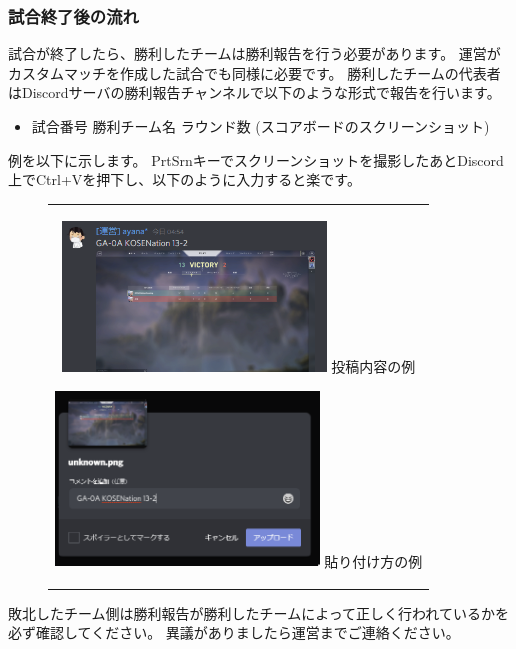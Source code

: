 \documentclass[uplatex,dvipdfmx]{jsarticle}
\begin{document}
	    \subsubsection{試合終了後の流れ}
	        試合が終了したら、勝利したチームは勝利報告を行う必要があります。
	        運営がカスタムマッチを作成した試合でも同様に必要です。
	        勝利したチームの代表者はDiscordサーバの勝利報告チャンネルで以下のような形式で報告を行います。
	        \begin{itemize}
	            \item 試合番号 勝利チーム名 ラウンド数 (スコアボードのスクリーンショット)
	        \end{itemize}
	        例を以下に示します。
	        PrtSrnキーでスクリーンショットを撮影したあとDiscord上でCtrl+Vを押下し、以下のように入力すると楽です。
	        \begin{figure}[H]
	            \begin{center}
	                \begin{tabular}{c}
	                    \begin{minipage}{0.5\hsize}
	                        \begin{center}
	                            \includegraphics[width=70mm]{result.png}
	                            \hspace{1.6cm} 投稿内容の例
	                        \end{center}
	                    \end{minipage}

	                    \begin{minipage}{0.5\hsize}
	                        \begin{center}
	                            \includegraphics[width=70mm]{example.png}
	                            \hspace{1.6cm} 貼り付け方の例
	                        \end{center}
	                    \end{minipage}
	                \end{tabular}
	            \end{center}
	        \end{figure}
	        敗北したチーム側は勝利報告が勝利したチームによって正しく行われているかを必ず確認してください。
	        異議がありましたら運営までご連絡ください。
\end{document}
